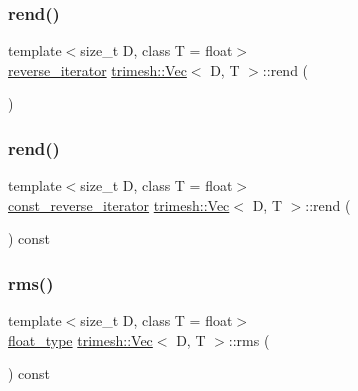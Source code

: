 \mbox{\label{classtrimesh_1_1Vec_acac7354cecf1d803c5d168ca0acfea57}} 
\subsubsection{\texorpdfstring{rend()}{rend()}\hspace{0.1cm}{\footnotesize\ttfamily [1/2]}}
{\footnotesize\ttfamily template$<$size\+\_\+t D, class T = float$>$ \\
\hyperlink{classtrimesh_1_1Vec_a42a460e6f54561faf9975298d46807ec}{reverse\+\_\+iterator} \hyperlink{classtrimesh_1_1Vec}{trimesh\+::\+Vec}$<$ D, T $>$\+::rend (\begin{DoxyParamCaption}{ }\end{DoxyParamCaption})\hspace{0.3cm}{\ttfamily [inline]}}

\mbox{\label{classtrimesh_1_1Vec_aa5fa2f2e3aaf736dacaa6b715b6338cb}} 
\subsubsection{\texorpdfstring{rend()}{rend()}\hspace{0.1cm}{\footnotesize\ttfamily [2/2]}}
{\footnotesize\ttfamily template$<$size\+\_\+t D, class T = float$>$ \\
\hyperlink{classtrimesh_1_1Vec_a0f78ea50431013f8f15b6286efc0dccd}{const\+\_\+reverse\+\_\+iterator} \hyperlink{classtrimesh_1_1Vec}{trimesh\+::\+Vec}$<$ D, T $>$\+::rend (\begin{DoxyParamCaption}{ }\end{DoxyParamCaption}) const\hspace{0.3cm}{\ttfamily [inline]}}

\mbox{\label{classtrimesh_1_1Vec_a83f1fd079bd1abde144fd2279d10c41b}} 
\subsubsection{\texorpdfstring{rms()}{rms()}}
{\footnotesize\ttfamily template$<$size\+\_\+t D, class T = float$>$ \\
\hyperlink{classtrimesh_1_1Vec_a2593716457a143008832235a3e4a9155}{float\+\_\+type} \hyperlink{classtrimesh_1_1Vec}{trimesh\+::\+Vec}$<$ D, T $>$\+::rms (\begin{DoxyParamCaption}{ }\end{DoxyParamCaption}) const\hspace{0.3cm}{\ttfamily [inline]}}

